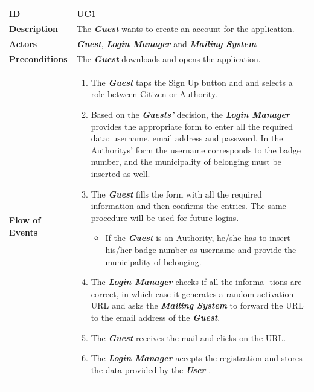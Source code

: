 \documentclass{report}
\begin{document}
\begin{tabularx}{\linewidth}{| l | X |}
	\hline
	\textbf{ID} & UC1\\
	
	\hline
	\textbf{Description} & The \textbf{\textit{Guest}} wants to create an account for the application.\\
	
	\hline
	\textbf{Actors} & \textbf{\textit{Guest}}, \textbf{\textit{Login Manager}} and \textbf{\textit{Mailing System}}\\
	
	\hline
	\textbf{Preconditions} & The \textbf{\textit{Guest}} downloads and opens the application.\\
	
	\hline
	\textbf{Flow of Events} & \parbox{0.7\textwidth}{	
		\begin{enumerate}
			\item The \textbf{\textit{Guest}} taps the Sign Up button and and selects a role between Citizen or Authority.
			\item Based on the \textbf{\textit{Guests'}} decision, the \textbf{\textit{Login Manager}} provides the appropriate form to enter all the required data: username, email address and password. In the Authoritys' form the username corresponds to the badge number, and the municipality of belonging must be inserted as well. 
			\item The \textbf{\textit{Guest}} fills the form with all the required information and then confirms the entries. The same procedure will be used for future logins.
			\begin{itemize}
				\item If the \textbf{\textit{Guest}} is an Authority, he/she has to insert his/her badge number as username and provide the municipality of belonging.
			\end{itemize}	
			\item The \textbf{\textit{Login Manager}} checks if all the informa-
			tions are correct, in which case it generates a random activation
			URL and asks the \textbf{\textit{Mailing System}} to forward the URL to the email address of the \textbf{\textit{Guest}}.
			\item The \textbf{\textit{Guest}} receives the mail and clicks on the URL. \item The \textbf{\textit{Login Manager}} accepts the registration and stores the data provided by the \textbf{\textit{User}} .
	\end{enumerate}}\\
	

\end{tabularx}
\end{document}
